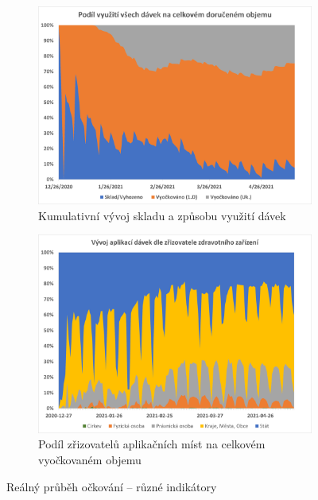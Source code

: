 \begin{figure}
\begin{subfigure}{0.45\textwidth}
\includegraphics[width=\textwidth]{assets/gr_vyuziti}
\caption{Kumulativní vývoj skladu a způsobu využití dávek}
\label{gr_vyuziti}
\end{subfigure}
%
\begin{subfigure}{0.45\textwidth}
\includegraphics[width=\textwidth]{assets/chart_zrizovatele}
\caption{Podíl zřizovatelů aplikačních míst na celkovém vyočkovaném objemu}
\label{gr_vyuziti_zrizovatele}
\end{subfigure}

\caption{Reálný průběh očkování -- různé indikátory}
\label{gr_prehledy}

\end{figure}



